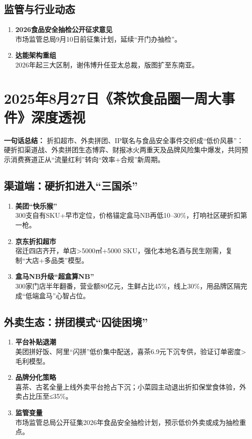 \subsection{监管与行业动态}
\begin{enumerate}[leftmargin=*, nosep]
    \item \textbf{2026食品安全抽检公开征求意见}  \\
    市场监管总局9月10日前征集计划，延续“开门办抽检”。
    \item \textbf{达能架构重组}  \\
    2026年起三大区制，谢伟博升任亚太总裁，版图扩至东南亚。
\end{enumerate}

\section{2025年8月27日《茶饮食品圈一周大事件》深度透视}
\textbf{一句话总结：}  
折扣超市、外卖拼团、IP联名与食品安全事件交织成“低价风暴”：硬折扣渠道战、外卖拼团生态博弈、财报冰火两重天及品牌风险集中爆发，共同预示消费赛道正从“流量红利”转向“效率+合规”新周期。

\subsection{渠道端：硬折扣进入“三国杀”}
\begin{enumerate}[leftmargin=*, nosep]
    \item \textbf{美团“快乐猴”}  \\
    300支自有SKU+早市定位，价格锚定盒马NB再低10–30\%，打响社区硬折扣第一枪。
    \item \textbf{京东折扣超市}  \\
    宿迁四店齐开，单店>5000㎡+5000 SKU，强化本地名酒与民生刚需，复制“大店+多品类”模型。
    \item \textbf{盒马NB升级“超盒算NB”}  \\
    300家门店半年翻番，营业额80亿元，生鲜占比45\%，线上30\%，用品牌区隔完成“低端盒马”心智占位。
\end{enumerate}

\subsection{外卖生态：拼团模式“囚徒困境”}
\begin{enumerate}[leftmargin=*, nosep]
    \item \textbf{平台补贴退潮}  \\
    美团拼好饭、阿里“闪拼”低价集中配送，喜茶6.9元下沉专供，验证订单密度>毛利模型。
    \item \textbf{品牌分化策略}  \\
    喜茶、古茗全量上线外卖平台抢占下沉；小菜园主动退出折扣保堂食体验，外卖占比压至≤35\%。
    \item \textbf{监管变量}  \\
    市场监管总局公开征集2026年食品安全抽检计划，预示低价外卖或成为抽检重点。
\end{enumerate}

